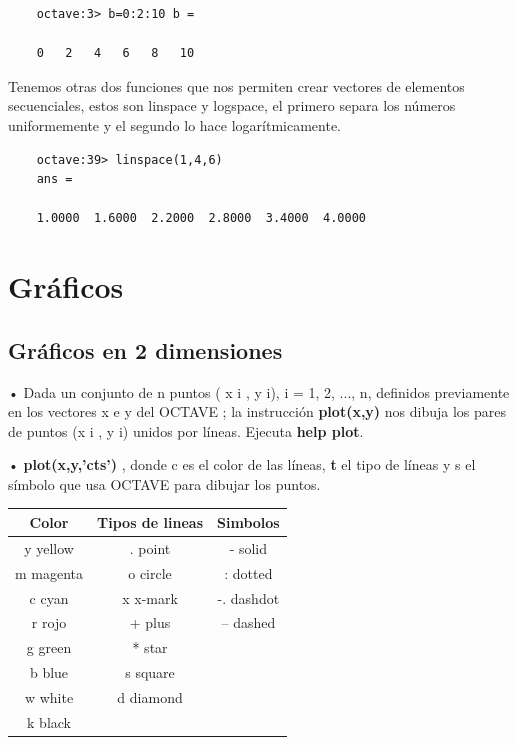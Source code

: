 \documentclass[a4,12pt]{article}
\begin{document}
\begin{verbatim}
	octave:3> b=0:2:10 b =

	0	2	4	6	8	10
\end{verbatim}

Tenemos	otras	dos	funciones	que	nos	permiten	crear	vectores	de	elementos secuenciales,  estos  son  linspace y  logspace,  el  primero  separa  los  números uniformemente y el segundo lo hace logarítmicamente.

\begin{verbatim}
	octave:39> linspace(1,4,6)
	ans =

	1.0000	1.6000	2.2000	2.8000	3.4000	4.0000
\end{verbatim}

\section{Gráficos}

\subsection{Gráficos en 2 dimensiones}

• Dada un conjunto de n puntos ( x i , y i), i = 1, 2, ..., n, definidos previamente en los vectores x e y del OCTAVE ; la instrucción \textbf{plot(x,y)} nos dibuja los pares de puntos (x i , y i) unidos por líneas. Ejecuta \textbf{help plot}.

• \textbf{plot(x,y,’cts’)} , donde c es el color de las líneas, \textbf{t} el tipo de líneas y s el símbolo que usa OCTAVE para dibujar los puntos.
\begin{center}
\begin{tabular}{|c|c|c|} \hline
\textbf{Color} &  \textbf{Tipos de lineas} & \textbf{Simbolos} \\ \hline
y yellow & . point & - solid \\ \hline
m magenta & o circle & : dotted \\ \hline
c cyan & x x-mark & -. dashdot \\ \hline
r rojo & + plus & – dashed \\ \hline
g green & * star &  \\ \hline
b blue & s square &  \\ \hline
w white & d diamond &  \\ \hline 
k black &  &  \\ \hline 
\end{tabular}
\end{center}
\end{document}
